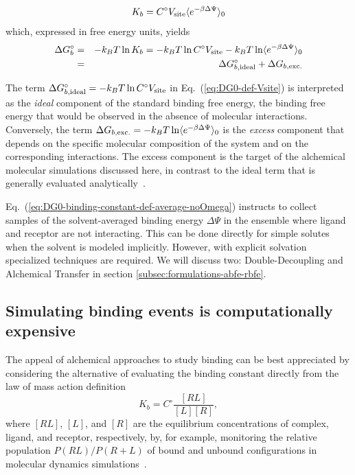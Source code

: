 \documentclass[9pt,bestpractices]{livecoms}
\begin{document}
\begin{equation}\label{eq:DG0-binding-constant-def-average-noOmega}
K_b = C^\circ V_{\rm site} \langle e^{-\beta \Delta \Psi}  \rangle_0 
\end{equation}
which, expressed in free energy units, yields
\begin{eqnarray}\label{eq:DG0-def-Vsite}
  \Delta G^\circ_b &=&  - k_B T \ln K_b = - k_B T \ln C^\circ V_{\rm site} - k_B T \ln \langle e^{-\beta \Delta \Psi}  \rangle_0 \nonumber \\
{\rm \ }  &=& \Delta G^\circ_{b,{\rm ideal}} + \Delta G_{b,{\rm exc.}}
\end{eqnarray}

The term $\Delta G^\circ_{b,{\rm ideal}} = - k_B T \ln C^\circ V_{\rm site}$ in Eq.~(\ref{eq:DG0-def-Vsite}) is interpreted as the \emph{ideal} component of the standard binding free energy, the binding free energy that would be observed in the absence of molecular interactions. Conversely, the term $\Delta G_{b,{\rm exc.}} = - k_B T \ln \langle e^{-\beta \Delta \Psi}  \rangle_0 $ is the \emph{excess} component that depends on the specific molecular composition of the system and on the corresponding interactions. The excess component is the target of the alchemical molecular simulations discussed here, in contrast to the ideal term that is generally evaluated analytically~\cite{boresch2003absolute}.

Eq.~(\ref{eq:DG0-binding-constant-def-average-noOmega}) instructs to collect samples of the solvent-averaged binding energy $\Delta \Psi$ in the ensemble where ligand and receptor are not interacting. This can be done directly for simple solutes when the solvent is modeled implicitly.\cite{gallicchio2014virtual} However, with explicit solvation specialized techniques are required. We will discuss two: Double-Decoupling and Alchemical Transfer in section \ref{subsec:formulations-abfe-rbfe}.


\subsection{Simulating binding events is computationally expensive}

The appeal of alchemical approaches to study binding can be best appreciated by considering the alternative of evaluating the binding constant directly from the law of mass action definition
\begin{equation}\label{eq:law-mass-action}
 K_b = C^{\circ}\frac{[RL]}{[L][R]},
\end{equation}
where $[RL]$, $[L]$, and $[R]$ are the equilibrium concentrations of complex, ligand, and receptor, respectively, by, for example, monitoring the relative population $P(RL)/P(R+L)$ of bound and unbound configurations in molecular dynamics simulations~\cite{jong2011determining,pan2017quantitative}.
\end{document}
